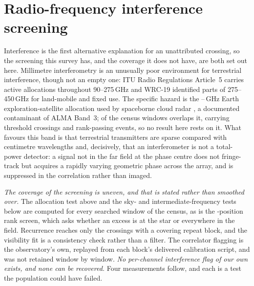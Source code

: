 \section{Radio-frequency interference screening}
\label{app:rfi}

Interference is the first alternative explanation for an unattributed
crossing, so the screening this survey has, and the coverage it does not
have, are both set out here. Millimetre interferometry is an unusually poor
environment for terrestrial interference, though not an empty one: ITU Radio
Regulations Article~5 \citep{ITU2024} carries active allocations throughout
90--275\,GHz and WRC-19 identified parts of 275--450\,GHz for land-mobile and
fixed use. The specific hazard is the \RadarLo--\RadarHi\,GHz Earth
exploration-satellite allocation used by spaceborne cloud radar
\citep{CloudSat2002,EarthCARE2023}, a documented contaminant of ALMA Band~3;
\RadarNWin{} of the \RadarNTot{} census windows overlaps it, carrying
\RadarNCross{} threshold crossings and \RadarNStage{} rank-passing events, so
no result here rests on it. What favours this band is that terrestrial
transmitters are sparse compared with centimetre wavelengths and, decisively,
that an interferometer is not a total-power detector: a signal not in the far
field at the phase centre does not fringe-track but acquires a rapidly
varying geometric phase across the array, and is suppressed in the
correlation rather than imaged.

\emph{The coverage of the screening is uneven, and that is stated rather than
smoothed over.} The allocation test above and the sky- and
intermediate-frequency tests below are computed for every searched window
of the census, as is the \NCtrl-position rank screen, which
asks whether an excess is at the star or everywhere in the field. Recurrence
reaches only the crossings with a covering repeat block, and the visibility
fit is a consistency check rather than a filter. The correlator flagging is
the observatory's own, replayed from each block's delivered calibration
script, and was not retained window by window. \emph{No
per-channel interference flag of our own exists, and none can be recovered.}
Four measurements follow, and each is a test the population could have
failed.

